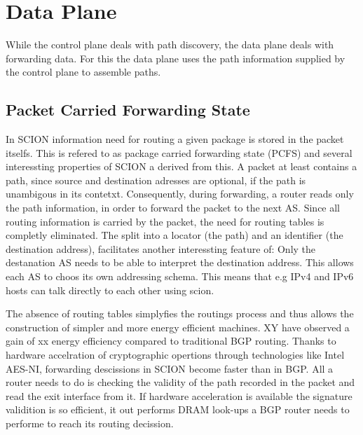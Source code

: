 \documentclass[../eva1_scion.tex]{subfiles}
\begin{document}
    \section{Data Plane}
    While the control plane deals with path discovery, the data plane deals with forwarding data. For this the data plane uses the path information supplied by the control plane to assemble paths.

    \subsection{Packet Carried Forwarding State}
    In SCION information need for routing a given package is stored in the packet itselfs. This is refered to as package carried forwarding state (PCFS) and several interessting properties of SCION a derived from this. A packet at least contains a path, since source and destination adresses are optional, if the path is unambigous in its contetxt. Consequently, during forwarding, a router reads only the path information, in order to forward the packet to the next AS. Since all routing information is carried by the packet, the need for routing tables is completly eliminated. The split into a locator (the path) and an identifier (the destination address), facilitates another interessting feature of: Only the destanation AS needs to be able to interpret the destination address. This allows each AS to choos its own addressing schema. This means that e.g IPv4 and IPv6 hosts can talk directly to each other using scion.

    The absence of routing tables simplyfies the routings process and thus allows the construction of simpler and more energy efficient machines. XY have observed a gain of xx  energy efficiency compared to traditional BGP routing. Thanks to hardware accelration of cryptographic opertions through technologies like Intel AES-NI, forwarding descissions in SCION become faster than in BGP. All a router needs to do is checking the validity of the path recorded in the packet and read the exit interface from it. If hardware acceleration is available the signature validition is so efficient, it out performs DRAM look-ups a BGP router needs to performe to reach its routing decission. 
\end{document}
